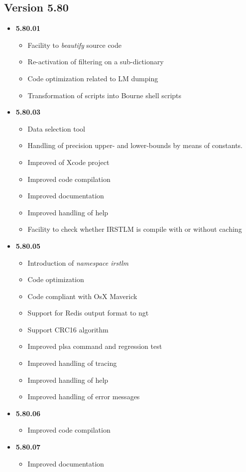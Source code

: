 \documentclass[11pt]{article}
\newcommand{\COMMENT}[1]{}
\begin{document}
\subsection{Version 5.80}
\begin{itemize}
\item {\bf 5.80.01}
\begin{itemize}
\item Facility to {\em beautify} source code
\item Re-activation of filtering on a sub-dictionary
\item Code optimization related to LM dumping
\item Transformation of scripts into Bourne shell scripts 
\end{itemize}
\item {\bf 5.80.03}
\begin{itemize}
\item Data selection tool
\item Handling of precision upper- and lower-bounds by means of constants.
\item Improved of Xcode project
\item Improved code compilation
\item Improved documentation
\item Improved handling of help
\item Facility to check whether IRSTLM is compile with or without caching
\end{itemize}
\item {\bf 5.80.05}
\begin{itemize}
\item Introduction of {\em namespace irstlm}
\item Code optimization
\item Code compliant with OsX Maverick
\item Support for Redis output format to ngt
\item Support CRC16 algorithm
\item Improved plsa command and regression test
\item Improved handling of tracing
\item Improved handling of help
\item Improved handling of error messages
\end{itemize}
\item {\bf 5.80.06}
\begin{itemize}
\item Improved code compilation
\end{itemize}
\item {\bf 5.80.07}
\begin{itemize}
\item Improved documentation
\end{itemize}
\end{itemize}


\COMMENT{
\subsection{Version 5.xx}
\begin{itemize}
\item {\bf 5.xx.01}
\begin{itemize}
\item 
\end{itemize}
\end{itemize}
}
\end{document}
